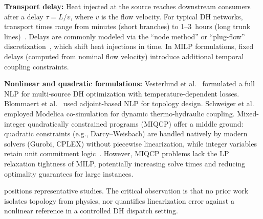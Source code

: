 \documentclass[review,3p]{elsarticle}
\begin{document}
\textbf{Transport delay:} Heat injected at the source reaches
downstream consumers after a delay $\tau = L / v$, where $v$ is
the flow velocity. For typical DH networks, transport times range
from minutes (short branches) to 1--3~hours (long trunk
lines)~\cite{vanderHeijde2017,Giraud2015}. Delays are commonly
modeled via the ``node method'' or ``plug-flow''
discretization~\cite{Benonysson1995,Gabrielaitiene2007}, which
shift heat injections in time. In MILP formulations, fixed delays
(computed from nominal flow velocity) introduce additional
temporal coupling constraints.

\textbf{Nonlinear and quadratic formulations:}
Vesterlund et al.~\cite{Vesterlund2017} formulated a full NLP for
multi-source DH optimization with temperature-dependent losses.
Blommaert et al.~\cite{Blommaert2020} used adjoint-based NLP for
topology design. Schweiger et al.~\cite{Schweiger2017} employed
Modelica co-simulation for dynamic thermo-hydraulic coupling.
Mixed-integer quadratically constrained programs (MIQCP) offer a
middle ground: quadratic constraints (e.g., Darcy--Weisbach) are
handled natively by modern solvers (Gurobi, CPLEX) without
piecewise linearization, while integer variables retain unit
commitment logic~\cite{Ommen2016}. However, MIQCP problems lack
the LP relaxation tightness of MILP, potentially increasing solve
times and reducing optimality guarantees for large instances.

 positions representative studies. The critical
observation is that no prior work isolates topology from physics, nor
quantifies linearization error against a nonlinear reference in a
controlled DH dispatch setting.
\end{document}
